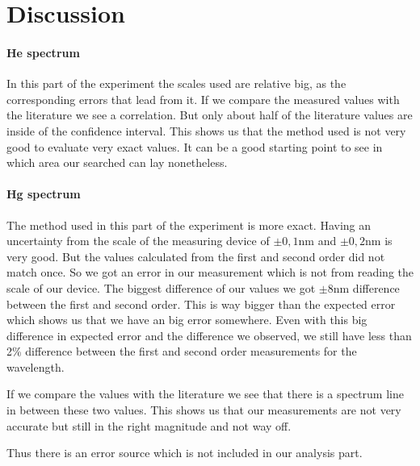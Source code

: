 \section{Discussion}


\paragraph{He spectrum}
In this part of the experiment the scales used are relative big, as the corresponding errors that lead from it.
If we compare the measured values with the literature we see a correlation. 
But only about half of the literature values are inside of the confidence interval.
This shows us that the method used is not very good to evaluate very exact values.
It can be a good starting point to see in which area our searched can lay nonetheless.

 

\paragraph{Hg spectrum}

The method used in this part of the experiment is more exact.
Having an uncertainty from the scale of the measuring device of $\pm0,1$\si{\nano\m} and $\pm0,2$\si{\nano\m} is very good.
But the values calculated from the first and second order did not match once. 
So we got an error in our measurement which is not from reading the scale of our device.
The biggest difference of our values we got $\pm 8$\si{\nano\m} difference between the first and second order. 
This is way bigger than the expected error which shows us that we have an big error somewhere.
Even with this big difference in expected error and the difference we observed, we still have less than 2\% difference between the first and second order measurements for the wavelength.

If we compare the values with the literature we see that there is a spectrum line in between these two values.
This shows us that our measurements are not very accurate but still in the right magnitude and not way off.

Thus there is an error source which is not included in our analysis part.



